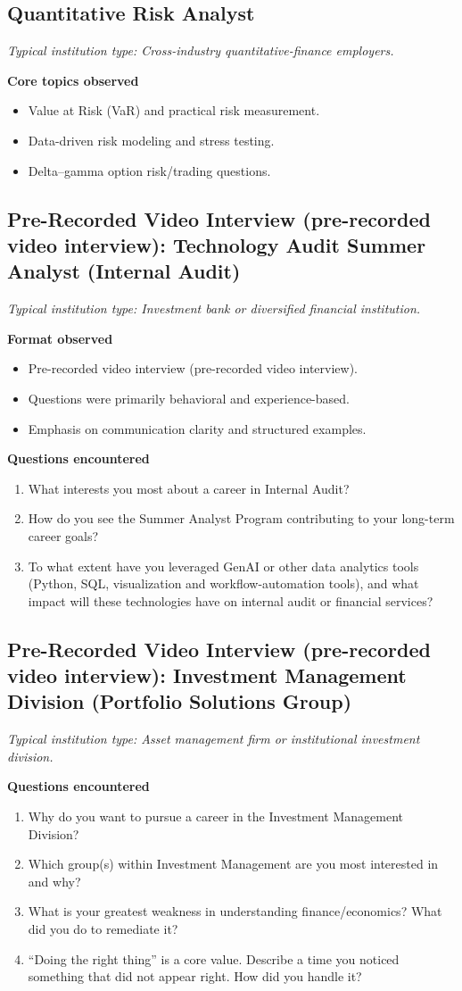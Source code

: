 \documentclass[11pt,letterpaper,openany]{book}
\newcommand{\RoleProfile}[2]{%
  \subsection{#1}%
  \noindent\textit{Typical institution type: #2.}\par
}
\begin{document}
\RoleProfile{Quantitative Risk Analyst}{Cross-industry quantitative-finance employers}
\textbf{Core topics observed}
\begin{itemize}
  \item Value at Risk (VaR) and practical risk measurement.
  \item Data-driven risk modeling and stress testing.
  \item Delta--gamma option risk/trading questions.
\end{itemize}

\RoleProfile{Pre-Recorded Video Interview (pre-recorded video interview): Technology Audit Summer Analyst (Internal Audit)}{Investment bank or diversified financial institution}
\textbf{Format observed}
\begin{itemize}
  \item Pre-recorded video interview (pre-recorded video interview).
  \item Questions were primarily behavioral and experience-based.
  \item Emphasis on communication clarity and structured examples.
\end{itemize}

\textbf{Questions encountered}
\begin{enumerate}
  \item What interests you most about a career in Internal Audit?
  \item How do you see the Summer Analyst Program contributing to your long-term career goals?
  \item To what extent have you leveraged GenAI or other data analytics tools (Python, SQL, visualization and workflow-automation tools), and what impact will these technologies have on internal audit or financial services?
\end{enumerate}

\RoleProfile{Pre-Recorded Video Interview (pre-recorded video interview): Investment Management Division (Portfolio Solutions Group)}{Asset management firm or institutional investment division}
\textbf{Questions encountered}
\begin{enumerate}
  \item Why do you want to pursue a career in the Investment Management Division?
  \item Which group(s) within Investment Management are you most interested in and why?
  \item What is your greatest weakness in understanding finance/economics? What did you do to remediate it?
  \item ``Doing the right thing'' is a core value. Describe a time you noticed something that did not appear right. How did you handle it?
\end{enumerate}
\end{document}
